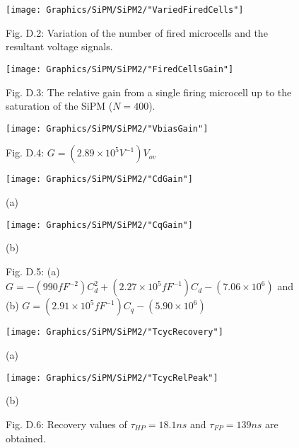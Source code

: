 \begin{figure}[h]
  \centering
  \texttt{[image: Graphics/SiPM/SiPM2/"VariedFiredCells"]}
  {\caption*{Fig. D.2: Variation of the number of fired microcells and the resultant voltage signals.}}
\end{figure}

\begin{figure}[h]
  \centering
  \texttt{[image: Graphics/SiPM/SiPM2/"FiredCellsGain"]}
  {\caption*{Fig. D.3: The relative gain from a single firing microcell up to the saturation of the SiPM ($N=400$).}}
\end{figure}

\begin{figure}[h]
  \centering
  \texttt{[image: Graphics/SiPM/SiPM2/"VbiasGain"]}
  {\caption*{Fig. D.4: $G=(2.89\times 10^5V^{-1})V_{ov}$}}
\end{figure}

\begin{figure}[h]
    \centering
    \begin{minipage}{0.5\linewidth}
        \centering
        \texttt{[image: Graphics/SiPM/SiPM2/"CdGain"]}
        \caption*{(a)}
    \end{minipage}\hfill
    \begin{minipage}{0.5\textwidth}
        \centering
        \texttt{[image: Graphics/SiPM/SiPM2/"CqGain"]}
        \caption*{(b)}
    \end{minipage}
    {\caption*{Fig. D.5: (a) $G=-(990fF^{-2})C_d^2+(2.27\times 10^5 fF^{-1})C_d-(7.06\times 10^6)$ and (b) $G=(2.91\times 10^5 fF^{-1})C_q-(5.90\times 10^6)$}}
\end{figure}

\begin{figure}[h]
    \centering
    \begin{minipage}{0.5\linewidth}
        \centering
        \texttt{[image: Graphics/SiPM/SiPM2/"TcycRecovery"]}
        \caption*{(a)}
    \end{minipage}\hfill
    \begin{minipage}{0.5\textwidth}
        \centering
        \texttt{[image: Graphics/SiPM/SiPM2/"TcycRelPeak"]}
        \caption*{(b)}
    \end{minipage}
    {\caption*{Fig. D.6: Recovery values of $\tau_{HP}=18.1ns$ and $\tau_{FP}=139ns$ are obtained.}}
\end{figure}

